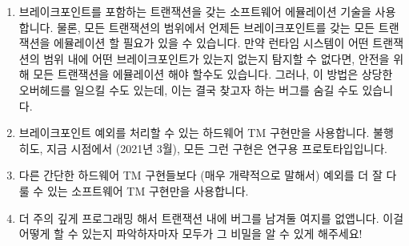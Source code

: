 \begin{enumerate}
\item	브레이크포인트를 포함하는 트랜잭션을 갖는 소프트웨어 에뮬레이션 기술을
	사용합니다.
	물론, 모든 트랜잭션의 범위에서 언제든 브레이크포인트를 갖는 모든
	트랜잭션을 에뮬레이션 할 필요가 있을 수 있습니다.
	만약 런타임 시스템이 어떤 트랜잭션의 범위 내에 어떤 브레이크포인트가
	있는지 없는지 탐지할 수 없다면, 안전을 위해 모든 트랜잭션을 에뮬레이션
	해야 할수도 있습니다.
	그러나, 이 방법은 상당한 오버헤드를 일으킬 수도 있는데, 이는 결국
	찾고자 하는 버그를 숨길 수도 있습니다.
\item	브레이크포인트 예외를 처리할 수 있는 하드웨어 TM 구현만을 사용합니다.
	불행히도, 지금 시점에서 (2021년 3월), 모든 그런 구현은 연구용
	프로토타입입니다.
\item	다른 간단한 하드웨어 TM 구현들보다 (매우 개략적으로 말해서) 예외를 더
	잘 다룰 수 있는 소프트웨어 TM 구현만을 사용합니다.
\item	더 주의 깊게 프로그래밍 해서 트랜잭션 내에 버그를 남겨둘 여지를
	없앱니다.
	이걸 어떻게 할 수 있는지 파악하자마자 모두가 그 비밀을 알 수 있게
	해주세요!

\end{enumerate}

